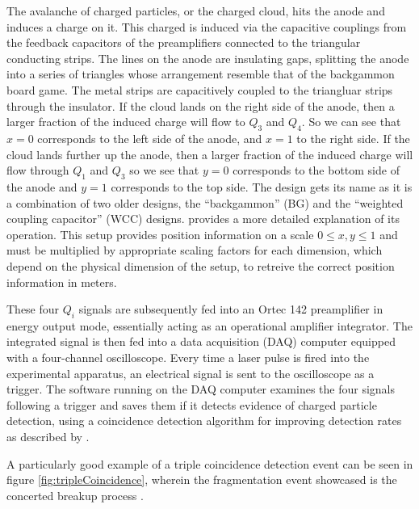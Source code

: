The avalanche of charged particles, or the charged cloud, hits the anode and induces a charge on it. This charged is induced via the capacitive couplings from the feedback capacitors of the preamplifiers connected to the triangular conducting strips. The lines on the anode are insulating gaps, splitting the anode into a series of triangles whose arrangement resemble that of the backgammon board game. The metal strips are capacitively coupled to the triangluar strips through the insulator. If the cloud lands on the right side of the anode, then a larger fraction of the induced charge will flow to $Q_3$ and $Q_4$. So we can see that $x=0$ corresponds to the left side of the anode, and $x=1$ to the right side. If the cloud lands further up the anode, then a larger fraction of the induced charge will flow through $Q_1$ and $Q_3$ so we see that $y=0$ corresponds to the bottom side of the anode and $y=1$ corresponds to the top side. The design gets its name as it is a combination of two older designs, the ``backgammon'' (BG) and the ``weighted coupling capacitor'' (WCC) designs. \citet{Mizogawa92} provides a more detailed explanation of its operation. This setup provides position information on a scale $0 \le x,y \le 1$ and must be multiplied by appropriate scaling factors for each dimension, which depend on the physical dimension of the setup, to retreive the correct position information in meters.

These four $Q_i$ signals are subsequently fed into an Ortec 142 preamplifier in energy output mode, essentially acting as an operational amplifier integrator. The integrated signal is then fed into a data acquisition (DAQ) computer equipped with a four-channel oscilloscope. Every time a laser pulse is fired into the experimental apparatus, an electrical signal is sent to the oscilloscope as a trigger. The software running on the DAQ computer examines the four signals following a trigger and saves them if it detects evidence of charged particle detection, using a coincidence detection algorithm for improving detection rates as described by \citet{Wales12Algorithm}.

A particularly good example of a triple coincidence detection event can be seen in figure \ref{fig:tripleCoincidence}, wherein the fragmentation event showcased is the concerted breakup process .

